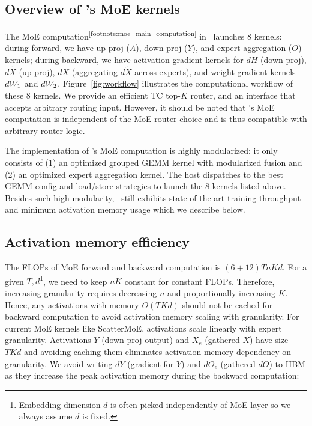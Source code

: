 \subsection{Overview of \Algname's MoE kernels}\label{sec:high-level}




The MoE computation\textsuperscript{\ref{footnote:moe_main_computation}} in \Algname~launches 8 kernels: during forward, we have up-proj ($A$), down-proj ($Y$), and expert aggregation ($O$) kernels; during backward, we have activation gradient kernels for $dH$ (down-proj), $d\tilde{X}$ (up-proj), $dX$ (aggregating $d\tilde{X}$ across experts), and weight gradient kernels $dW_{1}$ and $dW_{2}$. Figure~\ref{fig:workflow} illustrates the computational workflow of these 8 kernels. We provide an efficient TC top-$K$ router, and an interface that accepts arbitrary routing input. However, it should be noted that \Algname's MoE computation is independent of the MoE router choice and is thus compatible with arbitrary router logic.

The implementation of \Algname's MoE computation is highly modularized: it only consists of (1) an optimized grouped GEMM kernel with modularized fusion and (2) an optimized expert aggregation kernel. The host dispatches to the best GEMM config and load/store strategies to launch the 8 kernels listed above. Besides such high modularity, \Algname~still exhibits state-of-the-art training throughput and minimum activation memory usage which we describe below.


\subsection{Activation memory efficiency}\label{sec:mem-efficiency}
The FLOPs of MoE forward and backward computation is $(6+12)T n K d$. For a given $T,d$\footnote{Embedding dimension $d$ is often picked independently of MoE layer so we always assume $d$ is fixed.}, we need to keep $nK$ constant for constant FLOPs. Therefore, increasing granularity requires decreasing $n$ and proportionally increasing $K$. Hence, any activations with memory $O(TKd)$ should not be cached for backward computation to avoid activation memory scaling with granularity. For current MoE kernels like ScatterMoE, activations scale linearly with expert granularity.
Activations $Y$ (down-proj output) and $X_e$ (gathered $X$) have size $T K d$ and avoiding caching them eliminates activation memory dependency on granularity. We avoid writing $dY$ (gradient for $Y$) and $dO_e$ (gathered $dO$) to HBM as they increase the peak activation memory during the backward computation:


